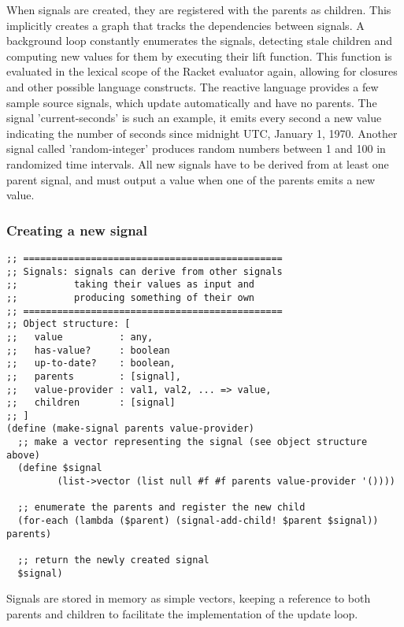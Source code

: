 When signals are created, they are registered with the parents as children. This implicitly creates a graph that tracks the dependencies between signals. A background loop constantly enumerates the signals, detecting stale children and computing new values for them by executing their lift function. This function is evaluated in the lexical scope of the Racket evaluator again, allowing for closures and other possible language constructs. 
The reactive language provides a few sample source signals, which update automatically and have no parents. The signal 'current-seconds' is such an example, it emits every second a new value indicating the number of seconds since midnight UTC, January 1, 1970. Another signal called 'random-integer' produces random numbers between 1 and 100 in randomized time intervals. 
All new signals have to be derived from at least one parent signal, and must output a value when one of the parents emits a new value.

\subsubsection{Creating a new signal}
\begin{lstlisting}
;; ==============================================
;; Signals: signals can derive from other signals 
;;          taking their values as input and 
;;          producing something of their own
;; ==============================================
;; Object structure: [
;;   value          : any,         
;;   has-value?     : boolean
;;   up-to-date?    : boolean,
;;   parents        : [signal],
;;   value-provider : val1, val2, ... => value,
;;   children       : [signal]
;; ]
(define (make-signal parents value-provider)
  ;; make a vector representing the signal (see object structure above)
  (define $signal 
         (list->vector (list null #f #f parents value-provider '())))

  ;; enumerate the parents and register the new child
  (for-each (lambda ($parent) (signal-add-child! $parent $signal)) parents)

  ;; return the newly created signal
  $signal)
\end{lstlisting}
Signals are stored in memory as simple vectors, keeping a reference to both parents and children to facilitate the implementation of the update loop. 

\newpage
